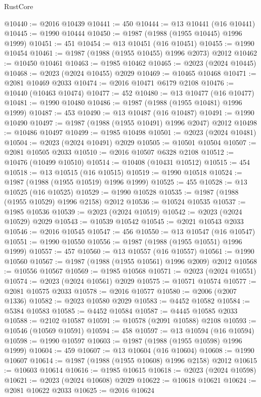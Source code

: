 \begin{lexlean}{RustCore}
\begin{coremodule}
@10440 := @2016 @10439
@10441 := 450
@10444 := @13 @10441 (@16 @10441)
@10445 := @1990 @10444
@10450 := @1987 (@1988 (@1955 @10445) @1996 @1999)
@10451 := 451
@10454 := @13 @10451 (@16 @10451)
@10455 := @1990 @10454
@10461 := @1987 (@1988 (@1955 @10455) @1996 @2073) @2012
@10462 := @10450 @10461
@10463 := @1985 @10462
@10465 := @2023 (@2024 @10445)
@10468 := @2023 (@2024 @10455) @2029
@10469 := @10465 @10468
@10471 := @2081 @10469 @2033
@10474 := @2016 @10471 @6179 @2108
@10476 := @10440 (@10463 @10474)
@10477 := 452
@10480 := @13 @10477 (@16 @10477)
@10481 := @1990 @10480
@10486 := @1987 (@1988 (@1955 @10481) @1996 @1999)
@10487 := 453
@10490 := @13 @10487 (@16 @10487)
@10491 := @1990 @10490
@10497 := @1987 (@1988 (@1955 @10491) @1996 @2047) @2012
@10498 := @10486 @10497
@10499 := @1985 @10498
@10501 := @2023 (@2024 @10481)
@10504 := @2023 (@2024 @10491) @2029
@10505 := @10501 @10504
@10507 := @2081 @10505 @2033
@10510 := @2016 @10507 @6328 @2108
@10512 := @10476 (@10499 @10510)
@10514 := @10408 (@10431 @10512)
@10515 := 454
@10518 := @13 @10515 (@16 @10515)
@10519 := @1990 @10518
@10524 := @1987 (@1988 (@1955 @10519) @1996 @1999)
@10525 := 455
@10528 := @13 @10525 (@16 @10525)
@10529 := @1990 @10528
@10535 := @1987 (@1988 (@1955 @10529) @1996 @2158) @2012
@10536 := @10524 @10535
@10537 := @1985 @10536
@10539 := @2023 (@2024 @10519)
@10542 := @2023 (@2024 @10529) @2029
@10543 := @10539 @10542
@10545 := @2021 @10543 @2033
@10546 := @2016 @10545
@10547 := 456
@10550 := @13 @10547 (@16 @10547)
@10551 := @1990 @10550
@10556 := @1987 (@1988 (@1955 @10551) @1996 @1999)
@10557 := 457
@10560 := @13 @10557 (@16 @10557)
@10561 := @1990 @10560
@10567 := @1987 (@1988 (@1955 @10561) @1996 @2009) @2012
@10568 := @10556 @10567
@10569 := @1985 @10568
@10571 := @2023 (@2024 @10551)
@10574 := @2023 (@2024 @10561) @2029
@10575 := @10571 @10574
@10577 := @2081 @10575 @2033
@10578 := @2016 @10577
@10580 := @2006 (@2007 @1336)
@10582 := @2023 @10580 @2029
@10583 := @4452 @10582
@10584 := @5384 @10583
@10585 := @4452 @10584
@10587 := @4445 @10585 @2033
@10588 := @2102 @10587
@10591 := @10578 (@2091 @10588) @2108
@10593 := @10546 (@10569 @10591)
@10594 := 458
@10597 := @13 @10594 (@16 @10594)
@10598 := @1990 @10597
@10603 := @1987 (@1988 (@1955 @10598) @1996 @1999)
@10604 := 459
@10607 := @13 @10604 (@16 @10604)
@10608 := @1990 @10607
@10614 := @1987 (@1988 (@1955 @10608) @1996 @2158) @2012
@10615 := @10603 @10614
@10616 := @1985 @10615
@10618 := @2023 (@2024 @10598)
@10621 := @2023 (@2024 @10608) @2029
@10622 := @10618 @10621
@10624 := @2081 @10622 @2033
@10625 := @2016 @10624

\end{coremodule}
\end{lexlean}
